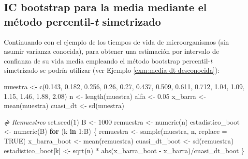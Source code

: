 \documentclass[
]{book}
\newenvironment{Shaded}{\begin{snugshade}}{\end{snugshade}}
\newcommand{\AttributeTok}[1]{\textcolor[rgb]{0.77,0.63,0.00}{#1}}
\newcommand{\CommentTok}[1]{\textcolor[rgb]{0.56,0.35,0.01}{\textit{#1}}}
\newcommand{\ConstantTok}[1]{\textcolor[rgb]{0.00,0.00,0.00}{#1}}
\newcommand{\ControlFlowTok}[1]{\textcolor[rgb]{0.13,0.29,0.53}{\textbf{#1}}}
\newcommand{\DecValTok}[1]{\textcolor[rgb]{0.00,0.00,0.81}{#1}}
\newcommand{\FloatTok}[1]{\textcolor[rgb]{0.00,0.00,0.81}{#1}}
\newcommand{\FunctionTok}[1]{\textcolor[rgb]{0.00,0.00,0.00}{#1}}
\newcommand{\NormalTok}[1]{#1}
\newcommand{\OtherTok}[1]{\textcolor[rgb]{0.56,0.35,0.01}{#1}}
\newcommand{\SpecialCharTok}[1]{\textcolor[rgb]{0.00,0.00,0.00}{#1}}
\theoremstyle{break}
\theoremstyle{definition}
\theoremstyle{definition}
\theoremstyle{definition}
\theoremstyle{definition}
\theoremstyle{remark}
\begin{document}
\hypertarget{media-dt-desconocida-persim}{%
\subsection{\texorpdfstring{IC bootstrap para la media mediante el método percentil-\emph{t} simetrizado}{IC bootstrap para la media mediante el método percentil-t simetrizado}}\label{media-dt-desconocida-persim}}

Continuando con el ejemplo de los tiempos de vida de microorganismos
(sin asumir varianza conocida),
para obtener una estimación por intervalo de confianza
de su vida media empleando el método bootstrap percentil-\emph{t} simetrizado
se podría utilizar (ver Ejemplo \ref{exm:media-dt-desconocida}):

\begin{Shaded}
\begin{Highlighting}[]
\NormalTok{muestra }\OtherTok{\textless{}{-}} \FunctionTok{c}\NormalTok{(}\FloatTok{0.143}\NormalTok{, }\FloatTok{0.182}\NormalTok{, }\FloatTok{0.256}\NormalTok{, }\FloatTok{0.26}\NormalTok{, }\FloatTok{0.27}\NormalTok{, }\FloatTok{0.437}\NormalTok{, }\FloatTok{0.509}\NormalTok{, }
             \FloatTok{0.611}\NormalTok{, }\FloatTok{0.712}\NormalTok{, }\FloatTok{1.04}\NormalTok{, }\FloatTok{1.09}\NormalTok{, }\FloatTok{1.15}\NormalTok{, }\FloatTok{1.46}\NormalTok{, }\FloatTok{1.88}\NormalTok{, }\FloatTok{2.08}\NormalTok{)}
\NormalTok{n }\OtherTok{\textless{}{-}} \FunctionTok{length}\NormalTok{(muestra)}
\NormalTok{alfa }\OtherTok{\textless{}{-}} \FloatTok{0.05}
\NormalTok{x\_barra }\OtherTok{\textless{}{-}} \FunctionTok{mean}\NormalTok{(muestra)}
\NormalTok{cuasi\_dt }\OtherTok{\textless{}{-}} \FunctionTok{sd}\NormalTok{(muestra)}

\CommentTok{\# Remuestreo}
\FunctionTok{set.seed}\NormalTok{(}\DecValTok{1}\NormalTok{)}
\NormalTok{B }\OtherTok{\textless{}{-}} \DecValTok{1000}
\NormalTok{remuestra }\OtherTok{\textless{}{-}} \FunctionTok{numeric}\NormalTok{(n)}
\NormalTok{estadistico\_boot }\OtherTok{\textless{}{-}} \FunctionTok{numeric}\NormalTok{(B)}
\ControlFlowTok{for}\NormalTok{ (k }\ControlFlowTok{in} \DecValTok{1}\SpecialCharTok{:}\NormalTok{B) \{}
\NormalTok{  remuestra }\OtherTok{\textless{}{-}} \FunctionTok{sample}\NormalTok{(muestra, n, }\AttributeTok{replace =} \ConstantTok{TRUE}\NormalTok{)}
\NormalTok{  x\_barra\_boot }\OtherTok{\textless{}{-}} \FunctionTok{mean}\NormalTok{(remuestra)}
\NormalTok{  cuasi\_dt\_boot }\OtherTok{\textless{}{-}} \FunctionTok{sd}\NormalTok{(remuestra)}
\NormalTok{  estadistico\_boot[k] }\OtherTok{\textless{}{-}} \FunctionTok{sqrt}\NormalTok{(n) }\SpecialCharTok{*} \FunctionTok{abs}\NormalTok{(x\_barra\_boot }\SpecialCharTok{{-}}\NormalTok{ x\_barra)}\SpecialCharTok{/}\NormalTok{cuasi\_dt\_boot}
\NormalTok{\}}


\end{Highlighting}
\end{Shaded}
\end{document}

